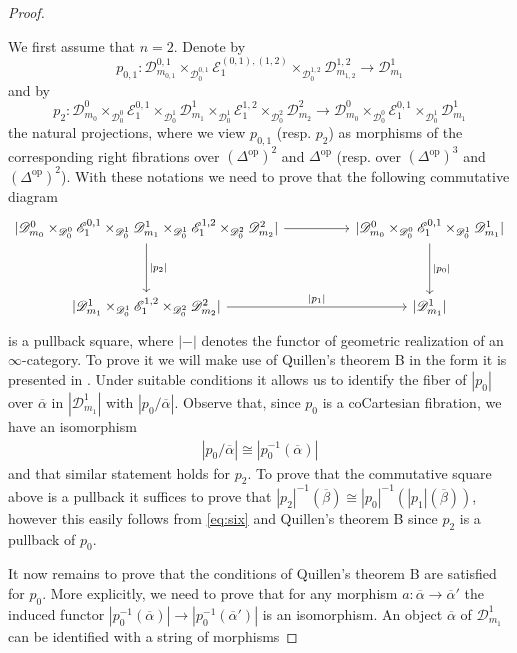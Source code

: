 \documentclass[a4paper, reqno]{amsart}
\theoremstyle{definition}
\newcommand\cD{\mathscr D}
\newcommand\cE{\mathscr E}
\newcommand\op{\mathrm{op}}
\begin{document}
\begin{proof}
\begin{tiny}
\end{tiny}
We first assume that $n=2$. Denote by \[p_{0,1}:\cD^{0,1}_{m_{0,1}}\times_{\cD_0^{0,1}}\cE^{(0,1),(1,2)}_1\times_{\cD_0^{1,2}}\cD^{1,2}_{m_{1,2}}\rightarrow\cD^{1}_{m_{1}}\]
and by
\[p_2:\cD^0_{m_0}\times_{\cD_0^0}\cE^{0,1}_1\times_{\cD_0^1}\cD^1_{m_1}\times_{\cD_0^1}\cE^{1,2}_1\times_{\cD_0^2}\cD^2_{m_2}\rightarrow\cD^0_{m_0}\times_{\cD_0^0}\cE^{0,1}_1\times_{\cD_0^1}\cD^1_{m_1}\] 
the natural projections, where we view $p_{0,1}$ (resp. $p_2$) as morphisms of the corresponding right fibrations over $(\Delta^\op)^2$ and $\Delta^\op$ (resp. over $(\Delta^\op)^3$ and $(\Delta^\op)^2$). With these notations we need to prove that the following commutative diagram
\[
\begin{tikzcd}[row sep=huge, column sep=huge]
{|\cD^0_{m_0}\times_{\cD_0^0}\cE^{0,1}_1\times_{\cD_0^1}\cD^1_{m_1}\times_{\cD_0^1}\cE^{1,2}_1\times_{\cD_0^2}\cD^2_{m_2}|}\arrow[r]\arrow[d, "|p_2|"]&{|\cD^0_{m_0}\times_{\cD_0^0}\cE^{0,1}_1\times_{\cD_0^1}\cD^1_{m_1}|}\arrow[d, "|p_0|"]\\
{|\cD^1_{m_1}\times_{\cD_0^1}\cE^{1,2}_1\times_{\cD_0^2}\cD^2_{m_2}|}\arrow[r, "|p_1|"]&{|\cD^1_{m_1}|}
\end{tikzcd}
\]
is a pullback square, where $|-|$ denotes the functor of geometric realization of an $\infty$-category. To prove it we will make use of Quillen's theorem B in the form it is presented in \cite[Theorem 5.16.]{ayala2017fibrations}. Under suitable conditions it allows us to identify the fiber of $|p_0|$ over $\overline{\alpha}$ in $|\cD^1_{m_1}|$ with $|p_0/\overline{\alpha}|$. Observe that, since $p_0$ is a coCartesian fibration, we have an isomorphism 
\begin{align}\label{eq:six}
    |p_0/\overline{\alpha}|\cong|p_0^{-1}(\overline{\alpha})|
\end{align}
and that similar statement holds for $p_2$. To prove that the commutative square above is a pullback it suffices to prove that $|p_2|^{-1}(\overline{\beta})\cong|p_0|^{-1}(|p_1|(\overline{\beta}))$, however this easily follows from \cref{eq:six} and Quillen's theorem B since $p_2$ is a pullback of $p_0$.\par
It now remains to prove that the conditions of Quillen's theorem B are satisfied for $p_0$. More explicitly, we need to prove that for any morphism $a:\overline{\alpha}\rightarrow\overline{\alpha}'$ the induced functor $|p_0^{-1}(\overline{\alpha})|\rightarrow|p_0^{-1}(\overline{\alpha}')|$ is an isomorphism. An object $\overline{\alpha}$ of $\cD^1_{m_1}$ can be identified with a string of morphisms 

\end{proof}
\end{document}

